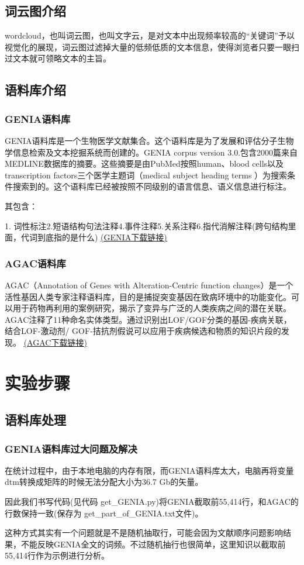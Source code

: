 \documentclass{article}
\begin{document}
\subsection{词云图介绍}
wordcloud，也叫词云图，也叫文字云，是对文本中出现频率较高的“关键词”予以视觉化的展现，词云图过滤掉大量的低频低质的文本信息，使得浏览者只要一眼扫过文本就可领略文本的主旨。
\subsection{语料库介绍}
	\subsubsection{GENIA语料库}
  GENIA语料库是一个生物医学文献集合。这个语料库是为了发展和评估分子生物学信息检索及文本挖掘系统而创建的。GENIA corpus version 3.0.包含2000篇来自MEDLINE数据库的摘要。这些摘要是由PubMed按照human、blood cells以及transcription factors三个医学主题词（medical subject heading terms ）为搜索条件搜索到的。这个语料库已经被按照不同级别的语言信息、语义信息进行标注。

其包含：

1. 词性标注2.短语结构句法注释4.事件注释5.关系注释6.指代消解注释(跨句结构里面，代词到底指的是什么)
\href{http://www.nactem.ac.uk/GENIA/current/GENIA-corpus/Part-of-speech/GENIAcorpus3.02p.tgz}{\underline{(GENIA下载链接)}}
	\subsubsection{AGAC语料库}
AGAC（Annotation of Genes with Alteration-Centric function changes）是一个活性基因人类专家注释语料库，目的是捕捉突变基因在致病环境中的功能变化。可以用于药物再利用的案例研究，揭示了变异与广泛的人类疾病之间的潜在关联。AGAC注释了11种命名实体类型。通过识别出LOF/GOF分类的基因-疾病关联，结合LOF-激动剂/ GOF-拮抗剂假说可以应用于疾病候选和物质的知识片段的发现。
\href{http://pubannotation.org/collections/AGAC}{\underline{(AGAC下载链接)}}

\section{实验步骤}
\subsection{语料库处理}
\subsubsection{GENIA语料库过大问题及解决}
在统计过程中，由于本地电脑的内存有限，而GENIA语料库太大，电脑再将变量dtm转换成矩阵的时候无法分配大小为36.7 Gb的矢量。\par
因此我们书写代码(见代码 get\_GENIA.py)将GENIA截取前55,414行，和AGAC的行数保持一致(保存为 get\_part\_of\_GENIA.txt文件)。\par
这种方式其实有一个问题就是不是随机抽取行，可能会因为文献顺序问题影响结果，不能反映GENIA全文的词频。不过随机抽行也很简单，这里知识以截取前55,414行作为示例进行分析。
\end{document}
